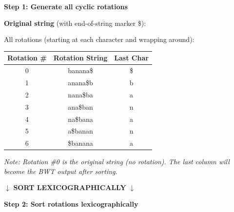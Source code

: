 \begin{examplebox}

\vspace{0.5cm}

\begin{minipage}{\textwidth}
\colorbox{step1color}{\textbf{Step 1: Generate all cyclic rotations}}

\vspace{0.3cm}

\textbf{Original string} (with end-of-string marker \$): 

\vspace{0.3cm}

All rotations (starting at each character and wrapping around):
\begin{center}
\begin{tabular}{|c|>{\ttfamily}c|>{\columncolor{lastcolcolor}}c|}
\hline
\textbf{Rotation \#} & \textbf{Rotation String} & \textbf{Last Char} \\
\hline
0 & banana\$ & \$ \\
1 & anana\$b & b \\
2 & nana\$ba & a \\
3 & ana\$ban & n \\
4 & na\$bana & a \\
5 & a\$banan & n \\
6 & \$banana & a \\
\hline
\end{tabular}
\end{center}
\small\emph{Note: Rotation \#0 is the original string (no rotation). The last column will become the BWT output after sorting.}
\end{minipage}

\vspace{0.8cm}
\textcolor{arrowcolor}{$\downarrow$ \textbf{SORT LEXICOGRAPHICALLY} $\downarrow$}
\vspace{0.8cm}

\begin{minipage}{\textwidth}
\colorbox{step2color}{\textbf{Step 2: Sort rotations lexicographically}}

\vspace{0.3cm}


\end{minipage}
\end{examplebox}
